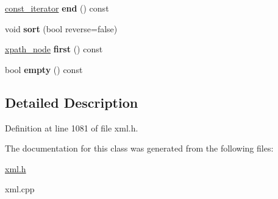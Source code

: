 \begin{DoxyCompactItemize}
\item 
\hypertarget{classphys_1_1xml_1_1xpath__NodeSet_a196bf923f46424d9051e32c8192423cd}{
\hyperlink{classphys_1_1xml_1_1xpath__node}{const\_\-iterator} {\bfseries end} () const }
\label{dc/d32/classphys_1_1xml_1_1xpath__NodeSet_a196bf923f46424d9051e32c8192423cd}

\item 
\hypertarget{classphys_1_1xml_1_1xpath__NodeSet_aeb8d93eb1bf07c23cddc9093869fee54}{
void {\bfseries sort} (bool reverse=false)}
\label{dc/d32/classphys_1_1xml_1_1xpath__NodeSet_aeb8d93eb1bf07c23cddc9093869fee54}

\item 
\hypertarget{classphys_1_1xml_1_1xpath__NodeSet_a883e2499559c2c6ee6f6d29e88455442}{
\hyperlink{classphys_1_1xml_1_1xpath__node}{xpath\_\-node} {\bfseries first} () const }
\label{dc/d32/classphys_1_1xml_1_1xpath__NodeSet_a883e2499559c2c6ee6f6d29e88455442}

\item 
\hypertarget{classphys_1_1xml_1_1xpath__NodeSet_adbfc308bf6d0bb44e646256be985a82e}{
bool {\bfseries empty} () const }
\label{dc/d32/classphys_1_1xml_1_1xpath__NodeSet_adbfc308bf6d0bb44e646256be985a82e}

\end{DoxyCompactItemize}


\subsection{Detailed Description}


Definition at line 1081 of file xml.h.



The documentation for this class was generated from the following files:\begin{DoxyCompactItemize}
\item 
\hyperlink{xml_8h}{xml.h}\item 
xml.cpp\end{DoxyCompactItemize}
